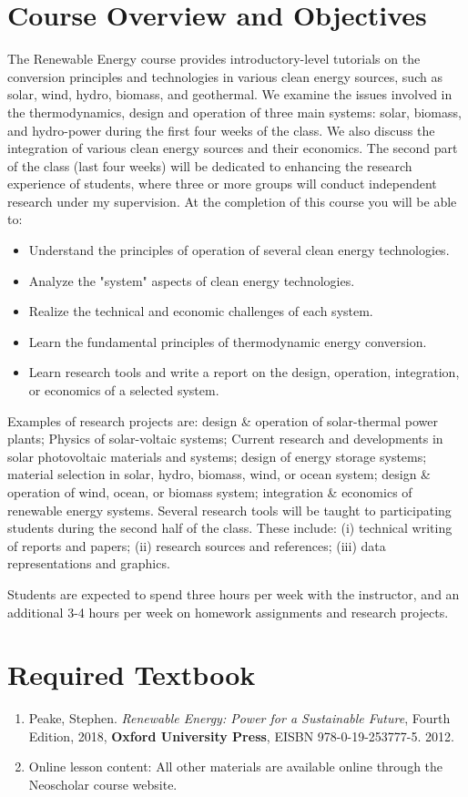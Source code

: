 \documentclass[11pt]{article}
\begin{document}
\section{Course Overview and Objectives}
The Renewable Energy course provides introductory-level tutorials on the 
conversion principles and technologies in various clean energy sources, such as solar, wind, hydro, biomass, and geothermal. We examine the issues involved in the thermodynamics, design and operation of three main systems: solar, biomass, and hydro-power during the first four weeks of the class. We also discuss the integration of various clean energy sources and their economics. The second part of the class (last four weeks) will be dedicated to enhancing the research experience of students, where three or more groups will conduct independent research under my supervision. At the completion of this course you will be able to:
\begin{itemize}
    \item Understand the principles of operation of several clean energy technologies.
    \item Analyze the "system" aspects of clean energy technologies.
     \item Realize the technical and economic challenges of each system.
    \item Learn the fundamental principles of thermodynamic energy conversion.
    \item Learn research tools and write a report on the design, operation, integration, or economics of a selected system.
\end{itemize}

Examples of research projects are: design \& operation of solar-thermal power plants; Physics of solar-voltaic systems; Current research and developments in solar photovoltaic materials and systems; design of energy storage systems; material selection in solar, hydro, biomass, wind, or ocean system; design \& operation of wind, ocean, or biomass system; integration \& economics of renewable energy systems. Several research tools will be taught to participating students during the second half of the class. These include: (i) technical writing of reports and papers; (ii) research sources and references; (iii) data representations and graphics.

Students are expected to spend three hours per week with the instructor, and an additional 3-4 hours per week on homework assignments and research projects.
\section{Required Textbook}
\begin{enumerate}
\item Peake, Stephen. \emph{Renewable Energy: Power for a Sustainable Future}, Fourth Edition, 2018, {\bf{Oxford University Press}}, EISBN 978-0-19-253777-5. 
2012.
\item Online lesson content: All other materials are available online through the Neoscholar course website.
\end{enumerate}
\end{document}
